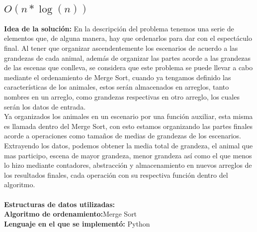 \documentclass{article}
\begin{document}
		\subsection{$O(n*\log(n))$}
			\textbf{Idea de la solución:}
			En la descripción del problema tenemos una serie de elementos que, de alguna manera, hay que ordenarlos para dar con el espectáculo 
			final. Al tener que organizar ascendentemente los escenarios de acuerdo a las grandezas de cada animal, además de organizar las partes
			acorde a las grandezas de las escenas que conlleva, se considera que este problema se puede llevar a cabo mediante el ordenamiento de Merge Sort,
			cuando ya tengamos definido las características de los animales, estos serán almacenados en arreglos, tanto nombres en un arreglo, 
			como grandezas respectivas en otro arreglo, los cuales serán los datos de entrada.\\
			Ya organizados los animales en un escenario por una función auxiliar, esta misma es llamada dentro del Merge Sort,
			con esto estamos organizando las partes finales acorde a operaciones como tamaños de medias de grandezas de los escenarios. 
			Extrayendo los datos, podemos obtener la media total de grandeza, el animal que mas participo, escena de mayor grandeza, 
			menor grandeza así como el que menos lo hizo mediante contadores, abstracción y almacenamiento en nuevos arreglos de 
			los resultados finales, cada operación con su respectiva función dentro del algoritmo.\\\\
			\textbf{Estructuras de datos utilizadas:} \\
			\textbf{Algoritmo de ordenamiento:}Merge Sort\\
			\textbf{Lenguaje en el que se implementó:} Python\\
\end{document}
